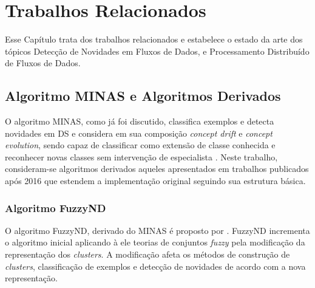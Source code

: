 \chapter{Trabalhos Relacionados}\label{cha:related}



Esse Capítulo trata dos trabalhos relacionados e estabelece o estado da arte
dos tópicos Detecção de Novidades em Fluxos de Dados, e 
Processamento Distribuído de Fluxos de Dados.

\section{Algoritmo MINAS e Algoritmos Derivados}

\newcommand{\cluster}{\emph{cluster}\xspace}
\newcommand{\clusters}{\emph{clusters}\xspace}
\newcommand{\dataset}{\emph{data set}\xspace}
\newcommand{\datasets}{\emph{data sets}\xspace}

O algoritmo MINAS, como já foi discutido, classifica exemplos e detecta
novidades em DS e considera em sua composição \emph{concept drift} e
\emph{concept evolution}, sendo capaz de classificar como extensão de classe
conhecida e reconhecer novas classes sem intervenção de especialista
\cite{Faria2016minas}. Neste trabalho, consideram-se algoritmos derivados
aqueles apresentados em trabalhos publicados após 2016 que estendem a
implementação original seguindo sua estrutura básica.

\subsection*{Algoritmo FuzzyND}


O algoritmo FuzzyND, derivado do MINAS é proposto por .
FuzzyND incrementa o algoritmo inicial aplicando à ele teorias de
conjuntos \emph{fuzzy} pela modificação da representação dos \clusters.
A modificação afeta os métodos de construção de \clusters, classificação
de exemplos e detecção de novidades de acordo com a nova representação.

